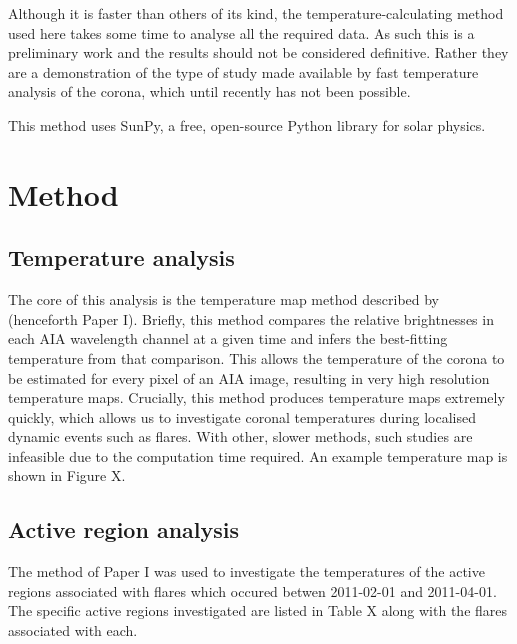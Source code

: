 \documentclass{article}
\begin{document}
Although it is faster than others of its kind, the temperature-calculating method used here takes some time to analyse all the required data.
As such this is a preliminary work and the results should not be considered definitive.
Rather they are a demonstration of the type of study made available by fast temperature analysis of the corona, which until recently has not been possible.

This method uses SunPy, a free, open-source Python library for solar physics.

\section{Method}
\subsection{Temperature analysis}
The core of this analysis is the temperature map method described by \cite{Leonard2014} (henceforth Paper I).
Briefly, this method compares the relative brightnesses in each AIA wavelength channel at a given time and infers the best-fitting temperature from that comparison.
This allows the temperature of the corona to be estimated for every pixel of an AIA image, resulting in very high resolution temperature maps.
Crucially, this method produces temperature maps extremely quickly, which allows us to investigate coronal temperatures during localised dynamic events such as flares.
With other, slower methods, such studies are infeasible due to the computation time required.
An example temperature map is shown in Figure X. %

\subsection{Active region analysis}
The method of Paper I was used to investigate the temperatures of the active regions associated with flares which occured betwen 2011-02-01 and 2011-04-01.
The specific active regions investigated are listed in Table X along with the flares associated with each. %
\end{document}
